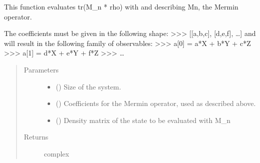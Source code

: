 \documentclass[letterpaper,10pt,english]{sphinxmanual}
\begin{document}

\begin{fulllineitems}
\label{\detokenize{mermin_eval:mermin_eval.M_eval_all}}
This function evaluates tr(M\_n * rho) with  and  describing Mn, the 
Mermin operator.

The coefficients must be given in the following shape:
\textgreater{}\textgreater{}\textgreater{} {[}{[}a,b,c{]}, {[}d,e,f{]}, …{]}
and will result in the following family of observables:
\textgreater{}\textgreater{}\textgreater{} a{[}0{]} = a*X + b*Y + c*Z
\textgreater{}\textgreater{}\textgreater{} a{[}1{]} = d*X + e*Y + f*Z
\textgreater{}\textgreater{}\textgreater{} …
\begin{quote}\begin{description}
\item[{Parameters}] \leavevmode\begin{itemize}
\item {} 
 () \textendash{} Size of the system.

\item {} 
\sphinxstyleliteralstrong{\sphinxupquote{, }} (\sphinxstyleliteralemphasis{\sphinxupquote{{[}}}\sphinxstyleliteralemphasis{\sphinxupquote{{[}}}\sphinxstyleliteralemphasis{\sphinxupquote{{]}}}\sphinxstyleliteralemphasis{\sphinxupquote{{]}}}) \textendash{} Coefficients for the Mermin 
operator, used as described above.

\item {} 
 (\sphinxstyleliteralemphasis{\sphinxupquote{{[}}}\sphinxstyleliteralemphasis{\sphinxupquote{{]}}}) \textendash{} Density matrix of the state to be evaluated with 
M\_n

\end{itemize}

\item[{Returns}] \leavevmode
complex

\end{description}\end{quote}

\end{fulllineitems}
\end{document}
